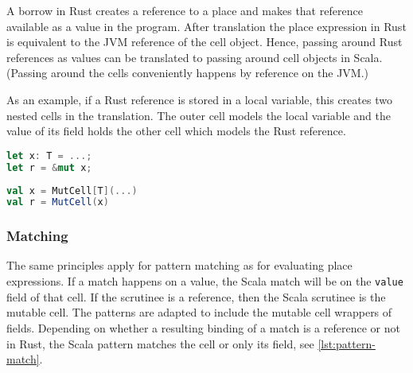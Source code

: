 A borrow in Rust creates a reference to a place and makes that reference
available as a value in the program. After translation the place expression in
Rust is equivalent to the JVM reference of the cell object. Hence, passing
around Rust references as values can be translated to passing around cell
objects in Scala. (Passing around the cells conveniently happens by reference on
the JVM.)

As an example, if a Rust reference is stored in a local variable, this creates
two nested cells in the translation. The outer cell models the local variable
and the value of its field holds the other cell which models the Rust reference.

\noindent\begin{minipage}[t]{.48\textwidth}
\begin{lstlisting}[language=Rust, caption={Taking a mutable reference in Rust.}]
let x: T = ...;
let r = &mut x;
\end{lstlisting}
\end{minipage}\hfill
\begin{minipage}[t]{.48\textwidth}
\begin{lstlisting}[language=Scala, caption={Mentioning the cell \lstinline!x! suffices in the translation.}]
val x = MutCell[T](...)
val r = MutCell(x)
\end{lstlisting}
\end{minipage}

\subsubsection{Matching}

The same principles apply for pattern matching as for evaluating place
expressions. If a match happens on a value, the Scala match will be on the
\passthrough{\lstinline!value!} field of that cell. If the scrutinee is a
reference, then the Scala scrutinee is the mutable cell. The patterns are
adapted to include the mutable cell wrappers of fields. Depending on whether a
resulting binding of a match is a reference or not in Rust, the Scala pattern
matches the cell or only its field, see \autoref{lst:pattern-match}.

